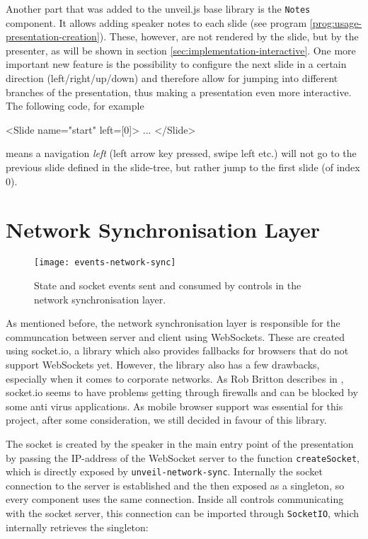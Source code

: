 Another part that was added to the unveil.js base library is the \texttt{Notes} component. It allows adding speaker notes to each slide (see program \ref{prog:usage-presentation-creation}). These, however, are not rendered by the slide, but by the presenter, as will be shown in section \ref{sec:implementation-interactive}. One more important new feature is the possibility to configure the next slide in a certain direction (left/right/up/down) and therefore allow for jumping into different branches of the presentation, thus making a presentation even more interactive. The following code, for example
%
\begin{JsCode}
  <Slide name="start" left={[0]}>
    ...
  </Slide>
\end{JsCode}
%
means a navigation \emph{left} (left arrow key pressed, swipe left etc.) will not go to the previous slide defined in the slide-tree, but rather jump to the first slide (of index $0$).

\section{Network Synchronisation Layer}
\label{sec:implementation-network-sync}

\begin{figure}
\centering
\texttt{[image: events-network-sync]}
\caption{State and socket events sent and consumed by controls in the network synchronisation layer.}
\label{fig:implementation-events-network-sync}
\end{figure}


As mentioned before, the network synchronisation layer is responsible for the communcation between server and client using WebSockets. These are created using socket.io, a library which also provides fallbacks for browsers that do not support WebSockets yet. However, the library also has a few drawbacks, especially when it comes to corporate networks. As Rob Britton describes in \cite{socketio-problems}, socket.io seems to have problems getting through firewalls and can be blocked by some anti virus applications.
As mobile browser support was essential for this project, after some consideration, we still decided in favour of this library.

The socket is created by the speaker in the main entry point of the presentation by passing the IP-address of the WebSocket server to the function \texttt{createSocket}, which is directly exposed by \texttt{unveil-network-sync}. Internally the socket connection to the server is established and the then exposed as a singleton, so every component uses the same connection. Inside all controls communicating with the socket server, this connection can be imported through \texttt{SocketIO}, which internally retrieves the singleton:

